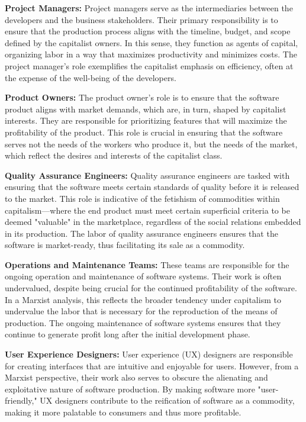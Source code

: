\begin{refsection}
\begin{multicols}{2}
{\textbf{Project Managers:} Project managers serve as the intermediaries between the developers and the business stakeholders. Their primary responsibility is to ensure that the production process aligns with the timeline, budget, and scope defined by the capitalist owners. In this sense, they function as agents of capital, organizing labor in a way that maximizes productivity and minimizes costs. The project manager's role exemplifies the capitalist emphasis on efficiency, often at the expense of the well-being of the developers.

\textbf{Product Owners:} The product owner’s role is to ensure that the software product aligns with market demands, which are, in turn, shaped by capitalist interests. They are responsible for prioritizing features that will maximize the profitability of the product. This role is crucial in ensuring that the software serves not the needs of the workers who produce it, but the needs of the market, which reflect the desires and interests of the capitalist class.

\textbf{Quality Assurance Engineers:} Quality assurance engineers are tasked with ensuring that the software meets certain standards of quality before it is released to the market. This role is indicative of the fetishism of commodities within capitalism—where the end product must meet certain superficial criteria to be deemed "valuable" in the marketplace, regardless of the social relations embedded in its production. The labor of quality assurance engineers ensures that the software is market-ready, thus facilitating its sale as a commodity.

\textbf{Operations and Maintenance Teams:} These teams are responsible for the ongoing operation and maintenance of software systems. Their work is often undervalued, despite being crucial for the continued profitability of the software. In a Marxist analysis, this reflects the broader tendency under capitalism to undervalue the labor that is necessary for the reproduction of the means of production. The ongoing maintenance of software systems ensures that they continue to generate profit long after the initial development phase.

\textbf{User Experience Designers:} User experience (UX) designers are responsible for creating interfaces that are intuitive and enjoyable for users. However, from a Marxist perspective, their work also serves to obscure the alienating and exploitative nature of software production. By making software more "user-friendly," UX designers contribute to the reification of software as a commodity, making it more palatable to consumers and thus more profitable.

}
\end{multicols}
\end{refsection}
